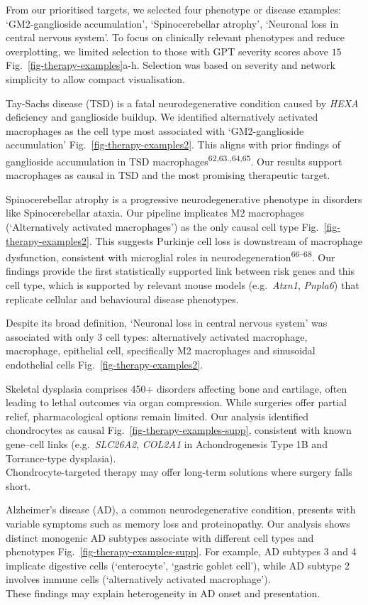 \documentclass[
]{article}
\begin{document}
From our prioritised targets, we selected four phenotype or disease
examples: `GM2-ganglioside accumulation', `Spinocerebellar atrophy',
`Neuronal loss in central nervous system'. To focus on clinically
relevant phenotypes and reduce overplotting, we limited selection to
those with GPT severity scores above \(15\)
Fig.~\ref{fig-therapy-examples}a-h. Selection was based on severity and
network simplicity to allow compact visualisation.

Tay-Sachs disease (TSD) is a fatal neurodegenerative condition caused by
\emph{HEXA} deficiency and ganglioside buildup. We identified
alternatively activated macrophages as the cell type most associated
with `GM2-ganglioside accumulation' Fig.~\ref{fig-therapy-examples2}.
This aligns with prior findings of ganglioside accumulation in TSD
macrophages\textsuperscript{62,63.,64,65}. Our results support
macrophages as causal in TSD and the most promising therapeutic target.

Spinocerebellar atrophy is a progressive neurodegenerative phenotype in
disorders like Spinocerebellar ataxia. Our pipeline implicates M2
macrophages (`Alternatively activated macrophages') as the only causal
cell type Fig.~\ref{fig-therapy-examples2}. This suggests Purkinje cell
loss is downstream of macrophage dysfunction, consistent with microglial
roles in neurodegeneration\textsuperscript{66--68}. Our findings provide
the first statistically supported link between risk genes and this cell
type, which is supported by relevant mouse models (e.g.~\emph{Atxn1},
\emph{Pnpla6}) that replicate cellular and behavioural disease
phenotypes.

Despite its broad definition, `Neuronal loss in central nervous system'
was associated with only 3 cell types: alternatively activated
macrophage, macrophage, epithelial cell, specifically M2 macrophages and
sinusoidal endothelial cells Fig.~\ref{fig-therapy-examples2}.

Skeletal dysplasia comprises 450+ disorders affecting bone and
cartilage, often leading to lethal outcomes via organ compression. While
surgeries offer partial relief, pharmacological options remain limited.
Our analysis identified chondrocytes as causal
Fig.~\ref{fig-therapy-examples-supp}, consistent with known gene--cell
links (e.g.~\emph{SLC26A2}, \emph{COL2A1} in Achondrogenesis Type 1B and
Torrance-type dysplasia).\\
Chondrocyte-targeted therapy may offer long-term solutions where surgery
falls short.

Alzheimer's disease (AD), a common neurodegenerative condition, presents
with variable symptoms such as memory loss and proteinopathy. Our
analysis shows distinct monogenic AD subtypes associate with different
cell types and phenotypes Fig.~\ref{fig-therapy-examples-supp}. For
example, AD subtypes 3 and 4 implicate digestive cells (`enterocyte',
`gastric goblet cell'), while AD subtype 2 involves immune cells
(`alternatively activated macrophage').\\
These findings may explain heterogeneity in AD onset and presentation.
\end{document}
